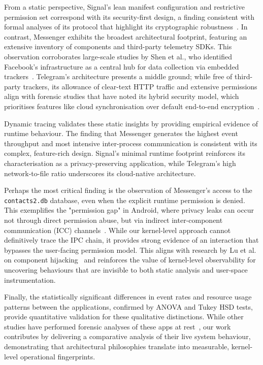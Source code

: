 \documentclass[a4paper,12pt]{report}
\begin{document}
From a static perspective, Signal’s lean manifest configuration and restrictive permission set correspond with its security-first design, a finding consistent with formal analyses of its protocol that highlight its cryptographic robustness~\cite{CohnGordon2017SignalAnalysis}. In contrast, Messenger exhibits the broadest architectural footprint, featuring an extensive inventory of components and third-party telemetry SDKs. This observation corroborates large-scale studies by Shen et al., who identified Facebook's infrastructure as a central hub for data collection via embedded trackers~\cite{ShenVervierStringhini2021}. Telegram's architecture presents a middle ground; while free of third-party trackers, its allowance of clear-text HTTP traffic and extensive permissions align with forensic studies that have noted its hybrid security model, which prioritises features like cloud synchronisation over default end-to-end encryption~\cite{moltchanov2018telegram}.

Dynamic tracing validates these static insights by providing empirical evidence of runtime behaviour. The finding that Messenger generates the highest event throughput and most intensive inter-process communication is consistent with its complex, feature-rich design. Signal's minimal runtime footprint reinforces its characterisation as a privacy-preserving application, while Telegram's high network-to-file ratio underscores its cloud-native architecture.

Perhaps the most critical finding is the observation of Messenger's access to the \texttt{contacts2.db} database, even when the explicit runtime permission is denied. This exemplifies the "permission gap" in Android, where privacy leaks can occur not through direct permission abuse, but via indirect inter-component communication (ICC) channels~\cite{li2015iccta}. While our kernel-level approach cannot definitively trace the IPC chain, it provides strong evidence of an interaction that bypasses the user-facing permission model. This aligns with research by Lu et al. on component hijacking~\cite{lu2012chex} and reinforces the value of kernel-level observability for uncovering behaviours that are invisible to both static analysis and user-space instrumentation.

Finally, the statistically significant differences in event rates and resource usage patterns between the applications, confirmed by ANOVA and Tukey HSD tests, provide quantitative validation for these qualitative distinctions. While other studies have performed forensic analyses of these apps at rest~\cite{anglano2015whatsapp, obermeier2018signal}, our work contributes by delivering a comparative analysis of their live system behaviour, demonstrating that architectural philosophies translate into measurable, kernel-level operational fingerprints.
\end{document}
